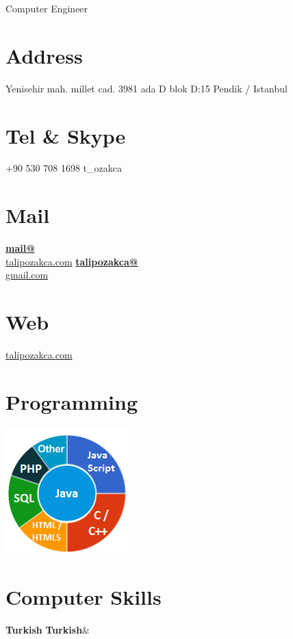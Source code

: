 \documentclass[]{friggeri-cv}
\begin{document}
      {Computer Engineer}
      

\begin{aside}
  \section{Address}
    Yenisehir mah. millet cad. 3981 ada D blok D:15 Pendik / Istanbul
    ~
  \section{Tel \& Skype}
    +90 530 708 1698
    t\_ozakca
    ~
  \section{Mail}
    \href{mailto:mail@talipozakca.com}{\textbf{mail@}\\talipozakca.com}
    \href{mailto:talipozakca@gmail.com}{\textbf{talipozakca@}\\gmail.com}
    ~
  \section{Web}
    \href{http://www.talipozakca.com}{talipozakca.com}
    ~
  \section{Programming}
    \includegraphics[scale=0.62]{img/programming.png}
    ~
    \section{Computer Skills}
    \textbf{Turkish}
    \textbf{Turkish}&
    ~
  
\end{aside}
\end{document}
